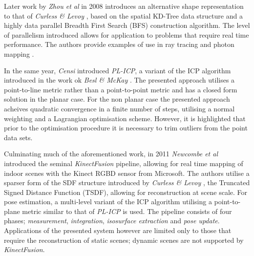 Later work by \textit{Zhou et al} \cite{Zhou2008} in 2008 introduces an alternative 
shape representation to that of \textit{Curless \& Levoy} \cite{Curless1996}, based 
on the spatial KD-Tree data structure and a highly data parallel Breadth First 
Search (BFS) construction algorithm. The level of parallelism introduced allows for 
application to problems that require real time performance. The authors provide 
examples of use in ray tracing \cite{Purcell2002} and photon mapping \cite{Kajiya1986}.

In the same year, \textit{Censi} \cite{Censi2008} introduced \textit{PL-ICP}, a 
variant of the ICP algorithm introduced in the work ok \textit{Besl \& McKay} 
\cite{Besl1992}. The presented approach utilises a point-to-line metric rather than 
a point-to-point metric and has a closed form solution in the planar case. For the non 
planar case the presented approach acheives quadratic convergence in a finite number of 
steps, utilising a normal weighting and a Lagrangian optimisation scheme. However, it is 
highlighted that prior to the optimisation procedure it is necessary to trim outliers 
from the point data sets.

Culminating much of the aforementioned work, in 2011 \textit{Newcombe et al} 
\cite{Newcombe2011} introduced the seminal \textit{KinectFusion} pipeline, allowing 
for real time mapping of indoor scenes with the Kinect RGBD sensor from Microsoft. The 
authors utilise a sparser form of the SDF structure introduced by \textit{Curless \& Levoy} 
\cite{Curless1996}, the Truncated Signed Distance Function (TSDF), allowing for reconstruction 
at scene scale. For pose estimation, a multi-level variant of the ICP algorithm utilising a 
point-to-plane metric similar to that of \textit{PL-ICP} \cite{Censi2008} is used. The pipeline 
consists of four phases; \textit{measurement}, \textit{integration}, \textit{isosurface extraction} 
and \textit{pose update}. Applications of the presented system however are limited only to 
those that require the reconstruction of static scenes; dynamic scenes are not supported 
by \textit{KinectFusion}.

